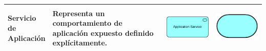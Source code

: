 \begin{longtable}{|p{0.15\linewidth}|p{0.45\linewidth}|p{0.2\linewidth} p{0.2\linewidth}|}
    Servicio de Aplicación 
    &
    Representa un comportamiento de aplicación expuesto definido explícitamente. 
    &
\begin{center}
    \includegraphics[width=1\linewidth]{imgs/capa_aplicacion/Aplication_service.pdf}
\end{center} &
\begin{center}
    \includegraphics[width=0.7\linewidth]{imgs/capa_aplicacion/service.pdf}
\end{center}
    \\ \hline


\end{longtable}
